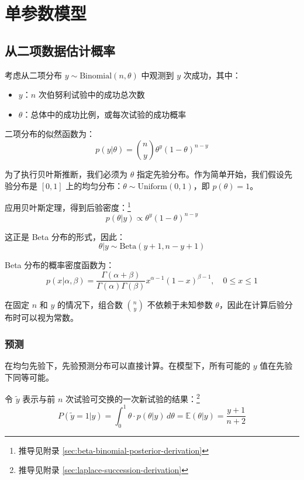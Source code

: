 
\chapter{单参数模型}

\section{从二项数据估计概率}

考虑从二项分布 $y \sim \text{Binomial}(n, \theta)$ 中观测到 $y$ 次成功，其中：
\begin{itemize}
  \item $y$：$n$ 次伯努利试验中的成功总次数
  \item $\theta$：总体中的成功比例，或每次试验的成功概率
\end{itemize}

二项分布的似然函数为：
\[
p(y|\theta) = \binom{n}{y} \theta^y (1-\theta)^{n-y}
\]

为了执行贝叶斯推断，我们必须为 $\theta$ 指定先验分布。作为简单开始，我们假设先验分布是 $[0, 1]$ 上的均匀分布：$\theta \sim \text{Uniform}(0, 1)$，即 $p(\theta) = 1$。

应用贝叶斯定理，得到后验密度：\footnote{推导见附录 \cref{sec:beta-binomial-posterior-derivation}}
\[
p(\theta|y) \propto \theta^y (1-\theta)^{n-y}
\]

这正是 Beta 分布的形式，因此：
\[
\theta|y \sim \text{Beta}(y+1, n-y+1)
\]

\begin{Definition}[Beta 分布]
  Beta 分布的概率密度函数为：
  \[
  p(x|\alpha, \beta) = \frac{\Gamma(\alpha+\beta)}{\Gamma(\alpha)\Gamma(\beta)} x^{\alpha-1}(1-x)^{\beta-1}, \quad 0 \leq x \leq 1
  \]
\end{Definition}

在固定 $n$ 和 $y$ 的情况下，组合数 $\binom{n}{y}$ 不依赖于未知参数 $\theta$，因此在计算后验分布时可以视为常数。

\subsection{预测}

在均匀先验下，先验预测分布可以直接计算。在模型下，所有可能的 $y$ 值在先验下同等可能。

令 $\tilde{y}$ 表示与前 $n$ 次试验可交换的一次新试验的结果：\footnote{推导见附录 \cref{sec:laplace-succession-derivation}}
\[
P(\tilde{y} = 1 | y) = \int_0^1 \theta \cdot p(\theta|y) \, d\theta = \mathbb{E}(\theta|y) = \frac{y+1}{n+2}
\]

